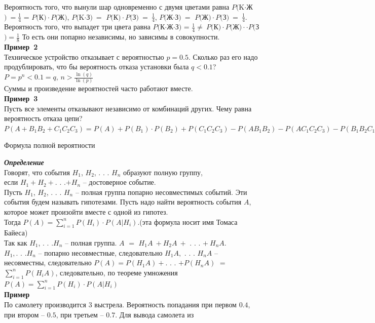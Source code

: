 \documentclass[russian, 12pt, fleqn]{article}
\begin{document}
Вероятность того, что вынули шар одновременно с двумя цветами равна $P($K$\cdot$Ж$)\ =\frac{1}{4}$ = $P($К$)\cdot P($Ж$)$,  $P($K$\cdot$З$)\ =$  $P($К$)\cdot P($З$)\  = \  \frac{1}{4}$, $P($Ж$\cdot$З$)\ =$  $P($Ж$)\cdot P($З$)\  =\ \frac{1}{4}$.\\Вероятность того, что выпадет три цвета равна $P($К$\cdot$Ж$\cdot$З$)$ = $\frac{1}{4}\neq \ P($К$)\cdot P($Ж$) \cdot \cdot  P($З$)=\frac{1}{8}$ То есть они попарно независимы, но зависимы в совокупности.\\
\textbf{Пример\ 2}\\
Техническое устройство отказывает с вероятностью $p=0.5$. Сколько раз его надо продублировать, что бы вероятность отказа установки была $q < 0.1$?\\
$P=p^n<0.1=q$, $n > \frac{\ln(q)}{\ln(p)}$\\
Суммы и произведение вероятностей часто работают вместе.\\
\textbf{Пример\ 3}\\ Пусть все элементы отказывают независимо от комбинаций других. Чему равна вероятность отказа цепи?\\
$P(A+B_1B_2+C_1C_2C_3)=P(A)+P(B_1)\cdot P(B_2)+P(C_1C_2C_3)-P(AB_1B_2)-P(AC_1C_2C_3)-P(B_1B_2C_1C_2C_3)+P(AB_1B_2C_1C_2C_3)$\\
\begin{center}
$\textbf{Формула полной вероятности }$
\end{center}
\textit{\textbf{Определение}}\\Говорят, что события $H_1$, $H_2$, . . . $H_n$ образуют полную группу, \\если $H_1+H_2+$. . .$+H_n$ -- достоверное событие.\\
Пусть $H_1$, $H_2$, . . . $H_n$ -- полная группа попарно несовместимых событий. Эти события будем называть гипотезами. Пусть надо найти вероятность события $A$, которое может произойти вместе с одной из гипотез.\\ Тогда $P(A)=\sum\limits_{i=1}^{n}P(H_i) \cdot P(A|H_i).$(эта формула носит имя Томаса Байеса)\\
Так как $H_1$, . . .$H_n$ -- полная группа. $A$ $=$ $H_1A\ +H_2A\ +$  . . .  $+\ H_nA$.\\
 $H_1,$. . .$H_n$ -- попарно несовместные, следовательно $H_1A,$ . . . $H_nA$ -- несовместны, следовательно $P(A)=P(H_1A) +$. . . $ + P(H_nA)$ $=$ $\sum\limits_{i = 1}^{n} P(H_iA)$, следовательно, по теореме умножения $P(A)=\sum\limits_{i = 1}^{n}P(H_i)\cdot P(A|H_i)$\\
\textbf{Пример\ }\\По самолету производится 3 выстрела. Вероятность попадания при первом $0.4$, при втором -- $0.5$, при третьем -- $0.7$. Для вывода самолета из
\end{document}
